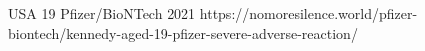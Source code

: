           {USA}
          {19}
          {Pfizer/BioNTech}
          {2021}
          {
          }
          {https://nomoresilence.world/pfizer-biontech/kennedy-aged-19-pfizer-severe-adverse-reaction/}

